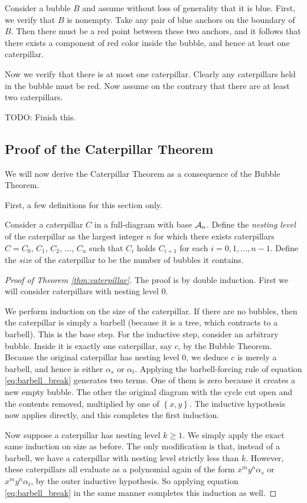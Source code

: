 Consider a bubble $B$ and assume without loss of generality that it is blue.  First, we verify that $B$ is nonempty.  Take any pair of blue anchors on the boundary of $B$.  Then there must be a red point between these two anchors, and it follows that there exists a component of red color inside the bubble, and hence at least one caterpillar.

Now we verify that there is at most one caterpillar.  Clearly any caterpillars held in the bubble must be red.  Now assume on the contrary that there are at least two caterpillars.  

TODO: Finish this.  

\subsection{Proof of the Caterpillar Theorem}
We will now derive the Caterpillar Theorem as a consequence of the Bubble Theorem.  

First, a few definitions for this section only.
\begin{definition*}
	Consider a caterpillar $C$ in a full-diagram with base $\AA_n$.  Define the \emph{nesting level} of the caterpillar as the largest integer $n$ for which there exists caterpillars $C = C_0$, $C_1$, $C_2$, $\dots$, $C_n$ such that $C_i$ holds $C_{i+1}$ for each $i=0,1,\dots,n-1$.  Define the \emph{size} of the caterpillar to be the number of bubbles it contains.
\end{definition*}

\begin{proof}[Proof of Theorem \ref{thm:caterpillar}]
	The proof is by double induction.  First we will consider caterpillars with nesting level $0$.  

	We perform induction on the size of the caterpillar. 
	If there are no bubbles, then the caterpillar is simply a barbell (because it is a tree, which contracts to a barbell).
	This is the base step.
	For the inductive step, consider an arbitrary bubble.  Inside it is exactly one caterpillar, say $c$, by the Bubble Theorem.  Because the original caterpillar has nesting level $0$, we deduce $c$ is merely a barbell, and hence is either $\alpha_s$ or $\alpha_t$.
	Applying the barbell-forcing rule of equation \eqref{eq:barbell_break} generates two terms.  One of them is zero because it creates a new empty bubble. The other the original diagram with the cycle cut open and the contents removed, multiplied by one of $\left\{ x,y \right\}$.  The inductive hypothesis now applies directly, and this completes the first induction.

	Now suppose a caterpillar has nesting level $k \ge 1$.  We simply apply the exact same induction on size as before.  The only modification is that, instead of a barbell, we have a caterpillar with nesting level strictly less than $k$.  However, these caterpillars all evaluate as a polynomial again of the form $x^my^n \alpha_s$ or $x^my^n\alpha_t$, by the outer inductive hypothesis.  So applying equation \eqref{eq:barbell_break} in the same manner completes this induction as well.
\end{proof}

